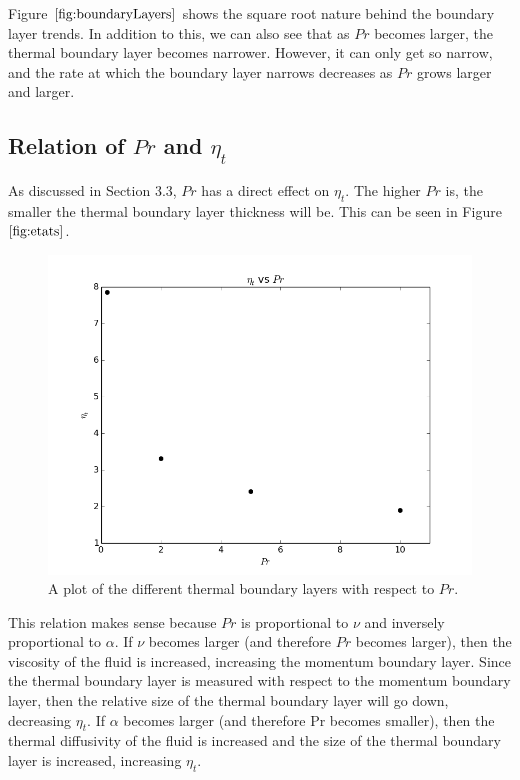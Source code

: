 \documentclass[12pt]{article}\pagestyle{myheadings}
\theoremstyle{plain}
\begin{document}
Figure $\ref{fig:boundaryLayers}$ shows the square root nature behind the boundary layer trends. In addition to this, we can also see that as $Pr$ becomes larger, the thermal boundary layer becomes narrower. However, it can only get so narrow, and the rate at which the boundary layer narrows decreases as $Pr$ grows larger and larger.

\break

\subsection{Relation of $Pr$ and $\eta_{t}$}
As discussed in Section 3.3, $Pr$ has a direct effect on $\eta_{t}$. The higher $Pr$ is, the smaller the thermal boundary layer thickness will be. This can be seen in Figure $\ref{fig:etats}$.

\begin{figure}[ht!]
\centering
\includegraphics[scale=0.6]{part6.png}
\caption{A plot of the different thermal boundary layers with respect to $Pr$.}
\label{fig:etats}
\end{figure}

\break

This relation makes sense because $Pr$ is proportional to $\nu$ and inversely proportional to $\alpha$. If $\nu$ becomes larger (and therefore $Pr$ becomes larger), then the viscosity of the fluid is increased, increasing the momentum boundary layer. Since the thermal boundary layer is measured with respect to the momentum boundary layer, then the relative size of the thermal boundary layer will go down, decreasing $\eta_{t}$. If $\alpha$ becomes larger (and therefore Pr becomes smaller), then the thermal diffusivity of the fluid is increased and the size of the thermal boundary layer is increased, increasing $\eta_{t}$.
\end{document}
